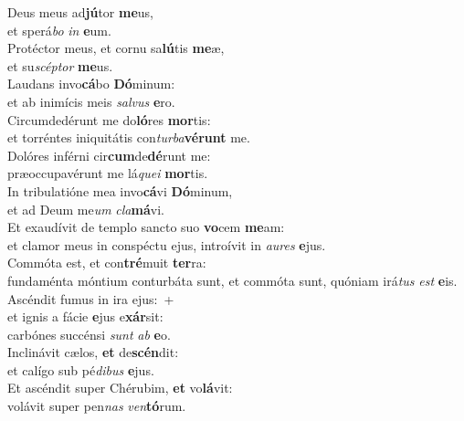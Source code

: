 \evenverse Deus meus ad\textbf{jú}tor \textbf{me}us,~\*\\
\evenverse et sperá\textit{bo} \textit{in} \textbf{e}um.\\
\oddverse Protéctor meus, et cornu sa\textbf{lú}tis \textbf{me}æ,~\*\\
\oddverse et su\textit{scép}\textit{tor} \textbf{me}us.\\
\evenverse Laudans invo\textbf{cá}bo \textbf{Dó}minum:~\*\\
\evenverse et ab inimícis meis \textit{sal}\textit{vus} \textbf{e}ro.\\
\oddverse Circumdedérunt me do\textbf{ló}res \textbf{mor}tis:~\*\\
\oddverse et torréntes iniquitátis con\textit{tur}\textit{ba}\textbf{vé}\textbf{runt} me.\\
\evenverse Dolóres inférni cir\textbf{cum}de\textbf{dé}runt me:~\*\\
\evenverse præoccupavérunt me lá\textit{que}\textit{i} \textbf{mor}tis.\\
\oddverse In tribulatióne mea invo\textbf{cá}vi \textbf{Dó}minum,~\*\\
\oddverse et ad Deum me\textit{um} \textit{cla}\textbf{má}vi.\\
\evenverse Et exaudívit de templo sancto suo \textbf{vo}cem \textbf{me}am:~\*\\
\evenverse et clamor meus in conspéctu ejus, introívit in \textit{au}\textit{res} \textbf{e}jus.\\
\oddverse Commóta est, et con\textbf{tré}muit \textbf{ter}ra:~\*\\
\oddverse fundaménta móntium conturbáta sunt, et commóta sunt, quóniam irá\textit{tus} \textit{est} \textbf{e}is.\\
\evenverse Ascéndit fumus in ira ejus:~+\\
\evenverse  et ignis a fácie \textbf{e}jus e\textbf{xár}sit:~\*\\
\evenverse carbónes succénsi \textit{sunt} \textit{ab} \textbf{e}o.\\
\oddverse Inclinávit cælos, \textbf{et} de\textbf{scén}dit:~\*\\
\oddverse et calígo sub pé\textit{di}\textit{bus} \textbf{e}jus.\\
\evenverse Et ascéndit super Chérubim, \textbf{et} vo\textbf{lá}vit:~\*\\
\evenverse volávit super pen\textit{nas} \textit{ven}\textbf{tó}rum.\\
